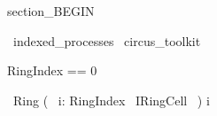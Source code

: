 section_BEGIN
\begin{zsection}
  \SECTION\ indexed\_processes \parents\ circus\_toolkit
\end{zsection}

\begin{zed}
     RingIndex == 0 
\end{zed}

\begin{circus}
	\circprocess\ Ring \circdef (~ \Interleave i: RingIndex \circindex\ IRingCell ~) \lcircindex i \rcircindex
\end{circus}

